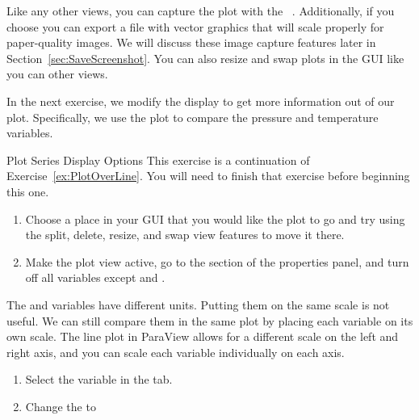 Like any other views, you can capture the plot with the  \ra
{}~. Additionally, if you
choose  \ra {} you can export a file with
vector graphics that will scale properly for paper-quality images.  We will
discuss these image capture features later in
Section~\ref{sec:SaveScreenshot}.  You can also resize and swap plots in
the GUI like you can other views.

In the next exercise, we modify the display to get more information out of
our plot.  Specifically, we use the plot to compare the pressure and
temperature variables.

\begin{exercise}{Plot Series Display Options}
  \label{ex:PlotSeriesDisplayOptions}%
  This exercise is a continuation of Exercise~\ref{ex:PlotOverLine}.  You
  will need to finish that exercise before beginning this one.

  \begin{enumerate}
  \item Choose a place in your GUI that you would like the plot to go and
    try using the split, delete, resize, and swap view features to move it
    there.
  \item Make the plot view active, go to the  section of the
    properties panel, and turn off all variables except  and
    .
    \savecounter
  \end{enumerate}

  The  and  variables have different units.  Putting
  them on the same scale is not useful.  We can still compare them in the
  same plot by placing each variable on its own scale.  The line plot in
  ParaView allows for a different scale on the left and right axis, and you
  can scale each variable individually on each axis.

  \begin{enumerate}
    \restorecounter
  \item Select the  variable in the  tab.
  \item Change the  to 
  \end{enumerate}


\end{exercise}

